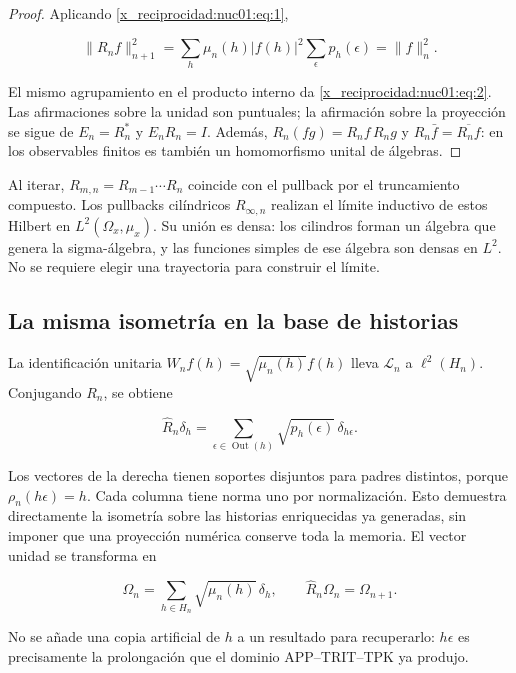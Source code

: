 \begin{proof}
Aplicando \eqref{x_reciprocidad:nuc01:eq:1},

\[
\|R_nf\|_{n+1}^2
=\sum_h\mu_n(h)|f(h)|^2\sum_\epsilon p_h(\epsilon)
=\|f\|_n^2.
\]

El mismo agrupamiento en el producto interno da \eqref{x_reciprocidad:nuc01:eq:2}. Las afirmaciones sobre la unidad son puntuales; la afirmación sobre la proyección se sigue de \(E_n=R_n^*\) y \(E_nR_n=I\). Además, \(R_n(fg)=R_nf\,R_ng\) y \(R_n\bar f=\overline{R_nf}\): en los observables finitos es también un homomorfismo unital de álgebras.
\end{proof}

Al iterar, \(R_{m,n}=R_{m-1}\cdots R_n\) coincide con el pullback por el truncamiento compuesto. Los pullbacks cilíndricos \(R_{\infty,n}\) realizan el límite inductivo de estos Hilbert en \(L^2(\Omega_x,\mu_x)\). Su unión es densa: los cilindros forman un álgebra que genera la sigma-álgebra, y las funciones simples de ese álgebra son densas en \(L^2\). No se requiere elegir una trayectoria para construir el límite.

\subsection{La misma isometría en la base de historias}

La identificación unitaria \(W_nf(h)=\sqrt{\mu_n(h)}f(h)\) lleva \(\mathscr L_n\) a \(\ell^2(H_n)\). Conjugando \(R_n\), se obtiene

\begin{equation}
\widehat R_n\delta_h
=\sum_{\epsilon\in\operatorname{Out}(h)}\sqrt{p_h(\epsilon)}\,\delta_{h\epsilon}.
\label{x_reciprocidad:nuc01:eq:3}
\end{equation}

Los vectores de la derecha tienen soportes disjuntos para padres distintos, porque \(\rho_n(h\epsilon)=h\). Cada columna tiene norma uno por normalización. Esto demuestra directamente la isometría sobre las historias enriquecidas ya generadas, sin imponer que una proyección numérica conserve toda la memoria. El vector unidad se transforma en

\[
\Omega_n=\sum_{h\in H_n}\sqrt{\mu_n(h)}\,\delta_h,
\qquad \widehat R_n\Omega_n=\Omega_{n+1}.
\]

No se añade una copia artificial de \(h\) a un resultado para recuperarlo: \(h\epsilon\) es precisamente la prolongación que el dominio APP–TRIT–TPK ya produjo.

